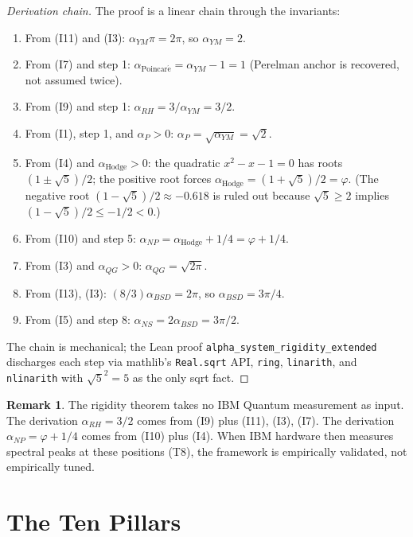 \documentclass[11pt,a4paper]{article}
\theoremstyle{definition}
\newtheorem{remark}[theorem]{Remark}
\begin{document}
\begin{proof}[Derivation chain]
The proof is a linear chain through the invariants:
\begin{enumerate}
\item From (I11) and (I3): $\alpha_{YM} \pi = 2\pi$, so
$\alpha_{YM} = 2$.
\item From (I7) and step 1: $\alpha_{\mathrm{Poincar\acute{e}}} =
\alpha_{YM} - 1 = 1$ (Perelman anchor is recovered, not assumed
twice).
\item From (I9) and step 1: $\alpha_{RH} = 3/\alpha_{YM} = 3/2$.
\item From (I1), step 1, and $\alpha_P > 0$:
$\alpha_P = \sqrt{\alpha_{YM}} = \sqrt{2}$.
\item From (I4) and $\alpha_{\mathrm{Hodge}} > 0$: the quadratic
$x^2 - x - 1 = 0$ has roots $(1 \pm \sqrt{5})/2$; the positive
root forces $\alpha_{\mathrm{Hodge}} = (1 + \sqrt{5})/2 = \varphi$.
(The negative root $(1 - \sqrt{5})/2 \approx -0.618$ is ruled out
because $\sqrt{5} \geq 2$ implies $(1 - \sqrt{5})/2 \leq -1/2 < 0$.)
\item From (I10) and step 5: $\alpha_{NP} = \alpha_{\mathrm{Hodge}} + 1/4
= \varphi + 1/4$.
\item From (I3) and $\alpha_{QG} > 0$: $\alpha_{QG} = \sqrt{2\pi}$.
\item From (I13), (I3): $(8/3) \alpha_{BSD} = 2\pi$, so
$\alpha_{BSD} = 3\pi/4$.
\item From (I5) and step 8: $\alpha_{NS} = 2 \alpha_{BSD} = 3\pi/2$.
\end{enumerate}
The chain is mechanical; the Lean proof
\texttt{alpha\_system\_rigidity\_extended} discharges each step via
mathlib's \texttt{Real.sqrt} API, \texttt{ring}, \texttt{linarith},
and \texttt{nlinarith} with $\sqrt{5}^2 = 5$ as the only sqrt fact.
\end{proof}

\begin{remark}
The rigidity theorem takes no IBM Quantum measurement as input. The
derivation $\alpha_{RH} = 3/2$ comes from (I9) plus (I11), (I3), (I7).
The derivation $\alpha_{NP} = \varphi + 1/4$ comes from (I10) plus
(I4). When IBM hardware then measures spectral peaks at these
positions (T8), the framework is empirically validated, not
empirically tuned.
\end{remark}

\section{The Ten Pillars}
\label{sec:ten-pillars}
\end{document}
